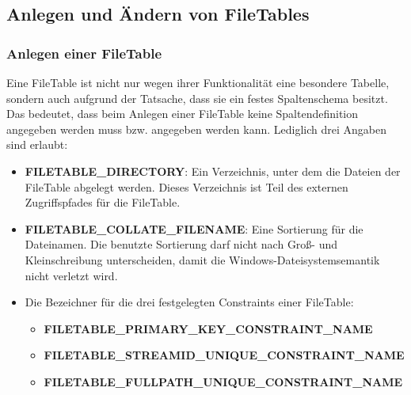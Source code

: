         \begin{small}
        \end{small}
        \begin{literaturinternet}
          \item \cite{gg492087}
        \end{literaturinternet}
      \subsection{Anlegen und Ändern von FileTables}
        \subsubsection{Anlegen einer FileTable}
          Eine FileTable ist nicht nur wegen ihrer Funktionalität eine
          besondere Tabelle, sondern auch aufgrund der Tatsache, dass sie ein
          festes Spaltenschema besitzt. Das bedeutet, dass beim Anlegen einer
          FileTable keine Spaltendefinition angegeben werden muss bzw. angegeben
          werden kann. Lediglich drei Angaben sind erlaubt:
          \begin{itemize}
            \item \textbf{FILETABLE\_DIRECTORY}: Ein Verzeichnis, unter dem
            die Dateien der FileTable abgelegt werden. Dieses Verzeichnis ist
            Teil des externen Zugriffspfades für die FileTable.
            \item \textbf{FILETABLE\_COLLATE\_FILENAME}: Eine Sortierung für
            die Dateinamen. Die benutzte Sortierung darf nicht nach Groß- und
            Kleinschreibung unterscheiden, damit die
            Windows-Dateisystemsemantik nicht verletzt wird.
            \item Die Bezeichner für die drei festgelegten Constraints einer
            FileTable:
            \begin{itemize}
              \item \textbf{FILETABLE\_PRIMARY\_KEY\_CONSTRAINT\_NAME}
              \item \textbf{FILETABLE\_STREAMID\_UNIQUE\_CONSTRAINT\_NAME}
              \item \textbf{FILETABLE\_FULLPATH\_UNIQUE\_CONSTRAINT\_NAME}
            \end{itemize} 
          \end{itemize}
